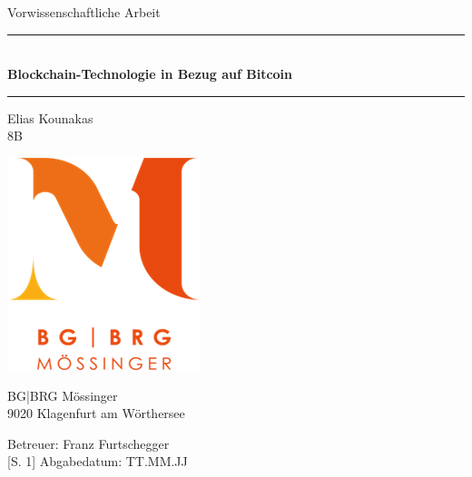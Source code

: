 

\begin{titlepage}
  \begin{center}
    \vspace*{-4cm}
    Vorwissenschaftliche Arbeit
    \vspace{1cm}

    \rule{440pt}{0.1pt}\\
    \vspace{0.5cm}
    \textbf{\Huge Blockchain-Technologie in Bezug auf Bitcoin}\\
    \rule{440pt}{0.1pt}

    \large
    \vspace{2cm}
    Elias Kounakas\\
    8B
    \vspace{2cm}

    \includegraphics{images/mossinger-logo.png}

    \vspace{2cm}
    BG|BRG Mössinger\\
    9020 Klagenfurt am Wörthersee
    \vspace{2cm}

    \vfill
    Betreuer: Franz Furtschegger\\
    \cite[Vgl.]{anto}[S. 1]
    Abgabedatum: TT.MM.JJ
    \vspace*{-5cm}
    \end{center}
\end{titlepage}